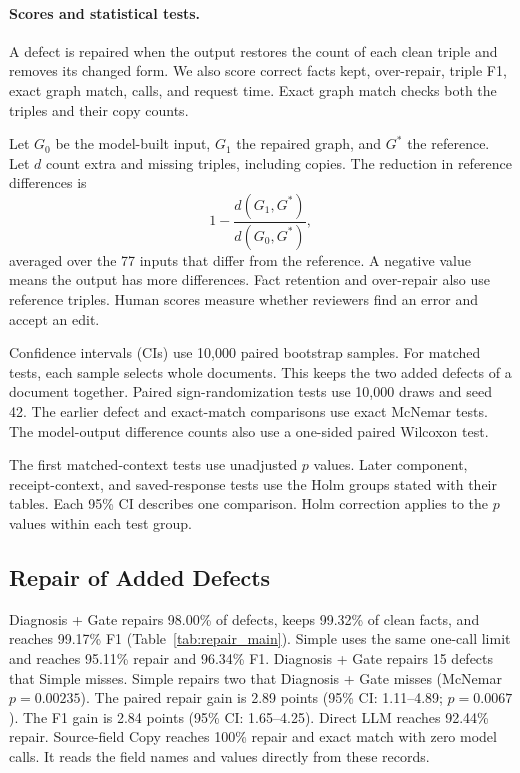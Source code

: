 \paragraph{Scores and statistical tests.}
A defect is repaired when the output restores the count of each clean triple
and removes its changed form. We also score correct facts kept, over-repair,
triple F1, exact graph match, calls, and request time. Exact graph match
checks both the triples and their copy counts.

Let $G_0$ be the model-built input, $G_1$ the repaired graph, and $G^*$
the reference. Let $d$ count extra and missing triples, including copies.
The reduction in reference differences is
\[
    1-\frac{d(G_1,G^*)}{d(G_0,G^*)},
\]
averaged over the 77 inputs that differ from the reference.
A negative value means the output has more differences. Fact retention
and over-repair also use reference triples. Human scores measure whether
reviewers find an error and accept an edit.

Confidence intervals (CIs) use 10,000 paired bootstrap samples.
For matched tests, each sample selects whole documents. This keeps the two
added defects of a document together. Paired sign-randomization tests use
10,000 draws and seed 42. The earlier defect and exact-match comparisons
use exact McNemar tests. The model-output difference counts also use a
one-sided paired Wilcoxon test.

The first matched-context tests use unadjusted $p$ values.
Later component, receipt-context, and saved-response tests use the Holm
groups stated with their tables. Each 95\% CI describes one comparison.
Holm correction applies to the $p$ values within each test group.

\subsection{Repair of Added Defects}
\label{sec:eval:overall}

Diagnosis + Gate repairs 98.00\% of defects, keeps 99.32\% of clean facts,
and reaches 99.17\% F1 (Table~\ref{tab:repair_main}).
Simple uses the same one-call limit and reaches 95.11\% repair and 96.34\%
F1. Diagnosis + Gate repairs 15 defects that Simple misses.
Simple repairs two that Diagnosis + Gate misses (McNemar $p=0.00235$).
The paired repair gain is 2.89 points (95\% CI: 1.11--4.89; $p=0.0067$).
The F1 gain is 2.84 points (95\% CI: 1.65--4.25).
Direct LLM reaches 92.44\% repair.
Source-field Copy reaches 100\% repair and exact match with zero model calls.
It reads the field names and values directly from these records.


